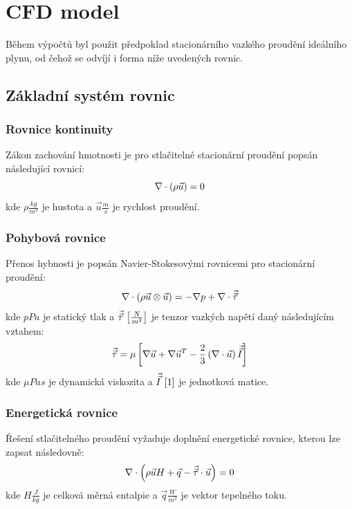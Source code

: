 \section{CFD model}
    Během výpočtů byl použit předpoklad stacionárního vazkého proudění ideálního plynu, od čehož se odvíjí i forma níže uvedených rovnic. 
    \subsection{Základní systém rovnic}
        
        \subsubsection{Rovnice kontinuity}
            Zákon zachování hmotnosti je pro stlačitelné stacionární proudění popsán následující rovnicí:
            \begin{equation} \label{eq:rovnice-kontinuity}
                \nabla \cdot  \left( \rho \Vec{u} \right) = 0  
            \end{equation}
            \noindent kde $\rho \unit{\frac{kg}{m^3}}$ je hustota a $\Vec{u} \unit{\frac{m}{s}}$  je rychlost proudění.
        
        \subsubsection{Pohybová rovnice}
            Přenos hybnosti je popsán Navier-Stokesovými rovnicemi pro stacionární proudění:
            \begin{equation} \label{eq:pohybova-rovnice}
                \nabla \cdot \left( \rho \Vec{u} \otimes \Vec{u} \right) = - \nabla p + \nabla \cdot \Vec{\Vec{\tau}}
            \end{equation}
            \noindent kde $p \unit{Pa}$ je statický tlak a $\Vec{\Vec{\tau}} \, \left[ \frac{N}{m^2} \right]$ je tenzor vazkých napětí daný následujícím vztahem:
            \begin{equation} \label{eq:tenzor-vazkych-napeti}
                \Vec{\Vec{\tau}} = \mu \left[ \nabla \Vec{u} + \nabla \Vec{u}^T - \frac{2}{3} \left( \nabla \cdot \Vec{u} \right) \Vec{\Vec{I}} \right]
            \end{equation}
            \noindent kde $\mu \unit{Pa s}$ je dynamická viskozita a $\Vec{\Vec{I}} \, \left[ 1 \right]$ je jednotková matice.
            
        \subsubsection{Energetická rovnice}
            Řešení stlačitelného proudění vyžaduje doplnění energetické rovnice, kterou lze zapsat následovně:
            \begin{equation} \label{eq:energeticka-rovnice}
                \nabla \cdot \left( \rho \Vec{u} H + \Vec{q} - \Vec{\Vec{\tau}} \cdot \Vec{u} \right) = 0
            \end{equation}
            \noindent kde $H \unit{\frac{J}{kg}}$ je celková měrná entalpie a $\Vec{q} \unit{\frac{W}{m^2}}$ je vektor tepelného toku.
